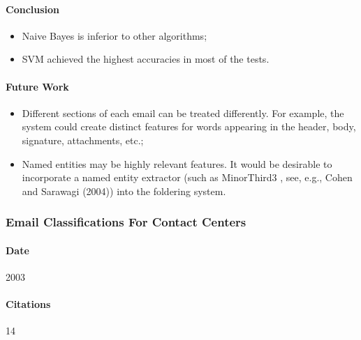 \documentclass[12pt]{article}
\begin{document}
\paragraph{Conclusion}
\begin{itemize}
    \item Naive Bayes is inferior to other algorithms;
    \item SVM achieved the highest accuracies in most of the tests.
\end{itemize}

\paragraph{Future Work}
\begin{itemize}
    \item Different sections of each email can be treated differently. For example, the system could create distinct features for words appearing in the header, body, signature, attachments, etc.;
    \item Named entities may be highly relevant features. It would be desirable to incorporate a named entity extractor (such as MinorThird3 , see, e.g., Cohen and Sarawagi (2004)) into the foldering system.
\end{itemize}





\subsubsection{Email Classifications For Contact Centers}
\paragraph{Date} 2003
\paragraph{Citations} 14
\end{document}
